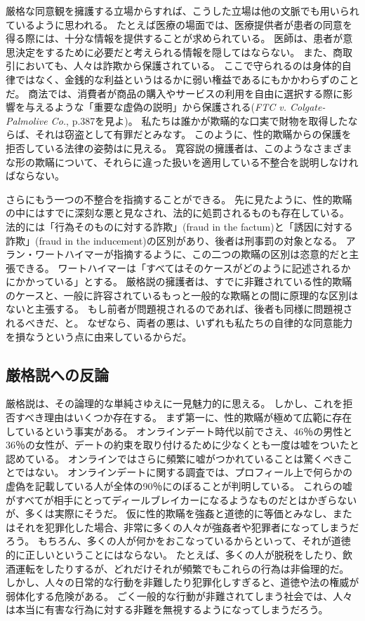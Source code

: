 \documentclass[paper=a4,book,openany]{jlreq}
\begin{document}
厳格な同意観を擁護する立場からすれば、こうした立場は他の文脈でも用いられているように思われる。
たとえば医療の場面では、医療提供者が患者の同意を得る際には、十分な情報を提供することが求められている。
医師は、患者が意思決定をするために必要だと考えられる情報を隠してはならない。
また、商取引においても、人々は詐欺から保護されている。
ここで守られるのは身体的自律ではなく、金銭的な利益というはるかに弱い権益であるにもかかわらずのことだ。
商法では、消費者が商品の購入やサービスの利用を自由に選択する際に影響を与えるような「重要な虚偽の説明」から保護される(\emph{FTC v. Colgate-Palmolive Co.}, p.387を見よ)。
私たちは誰かが欺瞞的な口実で財物を取得したならば、それは窃盗として有罪だとみなす。
このように、性的欺瞞からの保護を拒否している法律の姿勢はに見える\citep[][pp.69--71を見よ]{estrich87:_real_rape}。
寛容説の擁護者は、このようなさまざまな形の欺瞞について、それらに違った扱いを適用している不整合を説明しなければならない。

さらにもう一つの不整合を指摘することができる。
先に見たように、性的欺瞞の中にはすでに深刻な悪と見なされ、法的に処罰されるものも存在している。
法的には「行為そのものに対する詐欺」(fraud in the factum)と「誘因に対する詐欺」(fraud in the inducement)の区別があり、後者は刑事罰の対象となる。
アラン・ワートハイマーが指摘するように、この二つの欺瞞の区別は恣意的だと主張できる。
ワートハイマーは「すべてはそのケースがどのように記述されるかにかかっている」とする\citep[p.206]{wertheimer03:_consen_sexual_relat}。
厳格説の擁護者は、すでに非難されている性的欺瞞のケースと、一般に許容されているもっと一般的な欺瞞との間に原理的な区別はないと主張する。
もし前者が問題視されるのであれば、後者も同様に問題視されるべきだ、と。
なぜなら、両者の悪は、いずれも私たちの自律的な同意能力を損なうという点に由来しているからだ。

\subsection{厳格説への反論}

厳格説は、その論理的な単純さゆえに一見魅力的に思える。
しかし、これを拒否すべき理由はいくつか存在する。
まず第一に、性的欺瞞が極めて広範に存在しているという事実がある。
オンラインデート時代以前でさえ、46％の男性と36％の女性が、デートの約束を取り付けるために少なくとも一度は嘘をついたと認めている\citep{rowatt99:_lying_get_date}。
オンラインではさらに頻繁に嘘がつかれていることは驚くべきことではない。
オンラインデートに関する調査では、プロフィール上で何らかの虚偽を記載している人が全体の90％にのぼることが判明している\citep{hancock07:_truth_lying_onlin_datin_profil}。
これらの嘘がすべてが相手にとってディールブレイカーになるようなものだとはかぎらないが、多くは実際にそうだ。
仮に性的欺瞞を強姦と道徳的に等価とみなし、またはそれを犯罪化した場合、非常に多くの人々が強姦者や犯罪者になってしまうだろう。
もちろん、多くの人が何かをおこなっているからといって、それが道徳的に正しいということにはならない。
たとえば、多くの人が脱税をしたり、飲酒運転をしたりするが、どれだけそれが頻繁でもこれらの行為は非倫理的だ。
しかし、人々の日常的な行動を非難したり犯罪化しすぎると、道徳や法の権威が弱体化する危険がある。
ごく一般的な行動が非難されてしまう社会では、人々は本当に有害な行為に対する非難を無視するようになってしまうだろう。
\end{document}

